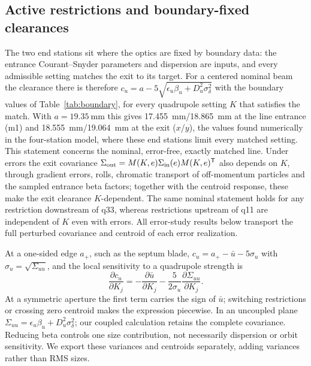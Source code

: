 \documentclass[final,5p,twocolumn]{elsarticle}
\begin{document}
\subsection{Active restrictions and boundary-fixed clearances}
The two end stations sit where the optics are fixed by boundary data: the entrance
Courant--Snyder parameters and dispersion are inputs, and every admissible setting matches the
exit to its target. For a centered nominal beam the clearance there is therefore
$c_u=a-5\sqrt{\epsilon_u\beta_u+D_u^2\sigma_\delta^2}$ with the boundary values of
Table~\ref{tab:boundary}, for every quadrupole setting $K$ that satisfies the match.
With $a=\SI{19.35}{\milli\metre}$ this gives \SI{17.455}{\milli\metre}/\SI{18.865}{\milli\metre} at the line entrance (m1) and \SI{18.555}{\milli\metre}/\SI{19.064}{\milli\metre}
at the exit ($x$/$y$), the values found numerically in the four-station model, where
these end stations limit every matched setting. This statement concerns the nominal, error-free, exactly matched line. Under
errors the exit covariance $\Sigma_{\rm out}=M(K,e)\Sigma_{\rm in}(e)M(K,e)^{\mathsf T}$
also depends on $K$, through gradient errors, rolls, chromatic transport of
off-momentum particles and the sampled entrance beta factors; together with the
centroid response, these make the exit clearance $K$-dependent. The same nominal
statement holds for any restriction downstream of q33, whereas restrictions upstream
of q11 are independent of $K$ even with errors. All error-study results below
transport the full perturbed covariance and centroid of each error realization.

At a one-sided edge $a_+$, such as the septum blade, $c_u=a_+-\bar u-5\sigma_u$ with
$\sigma_u=\sqrt{\Sigma_{uu}}$, and the local sensitivity to a quadrupole strength is
\begin{equation}
 \frac{\partial c_u}{\partial K_j}=
 -\frac{\partial\bar u}{\partial K_j}
 -\frac{5}{2\sigma_u}\frac{\partial\Sigma_{uu}}{\partial K_j}.
\end{equation}
At a symmetric aperture the first term carries the sign of $\bar u$; switching
restrictions or crossing zero centroid makes the expression piecewise.
In an uncoupled plane $\Sigma_{uu}=\epsilon_u\beta_u+D_u^2\sigma_\delta^2$;
our coupled calculation retains the complete covariance. Reducing beta controls
one size contribution, not necessarily dispersion or orbit sensitivity. We export
these variances and centroids separately, adding variances rather than RMS sizes.
\end{document}
